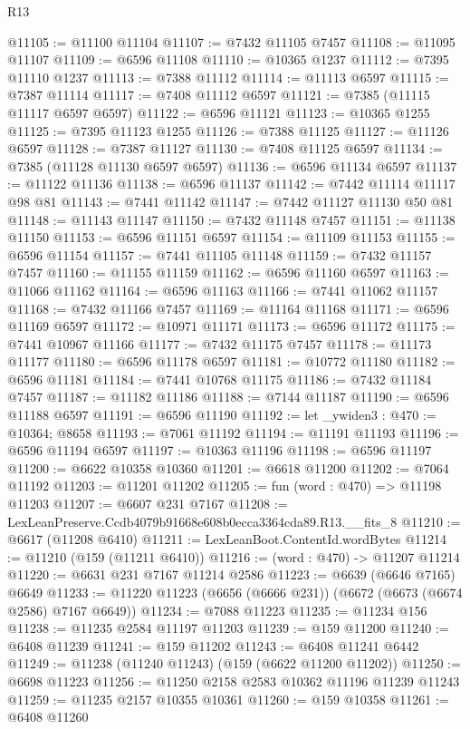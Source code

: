\begin{lexlean}{R13}
\begin{coremodule}
@11105 := @11100 @11104
@11107 := @7432 @11105 @7457
@11108 := @11095 @11107
@11109 := @6596 @11108
@11110 := @10365 @1237
@11112 := @7395 @11110 @1237
@11113 := @7388 @11112
@11114 := @11113 @6597
@11115 := @7387 @11114
@11117 := @7408 @11112 @6597
@11121 := @7385 (@11115 @11117 @6597 @6597)
@11122 := @6596 @11121
@11123 := @10365 @1255
@11125 := @7395 @11123 @1255
@11126 := @7388 @11125
@11127 := @11126 @6597
@11128 := @7387 @11127
@11130 := @7408 @11125 @6597
@11134 := @7385 (@11128 @11130 @6597 @6597)
@11136 := @6596 @11134 @6597
@11137 := @11122 @11136
@11138 := @6596 @11137
@11142 := @7442 @11114 @11117 @98 @81
@11143 := @7441 @11142
@11147 := @7442 @11127 @11130 @50 @81
@11148 := @11143 @11147
@11150 := @7432 @11148 @7457
@11151 := @11138 @11150
@11153 := @6596 @11151 @6597
@11154 := @11109 @11153
@11155 := @6596 @11154
@11157 := @7441 @11105 @11148
@11159 := @7432 @11157 @7457
@11160 := @11155 @11159
@11162 := @6596 @11160 @6597
@11163 := @11066 @11162
@11164 := @6596 @11163
@11166 := @7441 @11062 @11157
@11168 := @7432 @11166 @7457
@11169 := @11164 @11168
@11171 := @6596 @11169 @6597
@11172 := @10971 @11171
@11173 := @6596 @11172
@11175 := @7441 @10967 @11166
@11177 := @7432 @11175 @7457
@11178 := @11173 @11177
@11180 := @6596 @11178 @6597
@11181 := @10772 @11180
@11182 := @6596 @11181
@11184 := @7441 @10768 @11175
@11186 := @7432 @11184 @7457
@11187 := @11182 @11186
@11188 := @7144 @11187
@11190 := @6596 @11188 @6597
@11191 := @6596 @11190
@11192 := let _ywiden3 : @470 := @10364; @8658
@11193 := @7061 @11192
@11194 := @11191 @11193
@11196 := @6596 @11194 @6597
@11197 := @10363 @11196
@11198 := @6596 @11197
@11200 := @6622 @10358 @10360
@11201 := @6618 @11200
@11202 := @7064 @11192
@11203 := @11201 @11202
@11205 := fun (word : @470) => @11198 @11203
@11207 := @6607 @231 @7167
@11208 := LexLeanPreserve.Ccdb4079b91668e608b0ecca3364cda89.R13.__fits_8
@11210 := @6617 (@11208 @6410)
@11211 := LexLeanBoot.ContentId.wordBytes
@11214 := @11210 (@159 (@11211 @6410))
@11216 := (word : @470) -> @11207 @11214
@11220 := @6631 @231 @7167 @11214 @2586
@11223 := @6639 (@6646 @7165) @6649
@11233 := @11220 @11223 (@6656 (@6666 @231)) (@6672 (@6673 (@6674 @2586) @7167 @6649))
@11234 := @7088 @11223
@11235 := @11234 @156
@11238 := @11235 @2584 @11197 @11203
@11239 := @159 @11200
@11240 := @6408 @11239
@11241 := @159 @11202
@11243 := @6408 @11241 @6442
@11249 := @11238 (@11240 @11243) (@159 (@6622 @11200 @11202))
@11250 := @6698 @11223
@11256 := @11250 @2158 @2583 @10362 @11196 @11239 @11243
@11259 := @11235 @2157 @10355 @10361
@11260 := @159 @10358
@11261 := @6408 @11260

\end{coremodule}
\end{lexlean}
